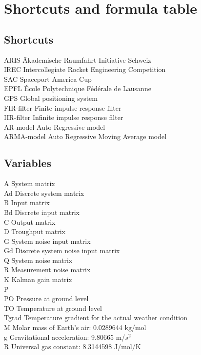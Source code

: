 \chapter{Shortcuts and formula table}
\section{Shortcuts}
\begin{tabbing}
 ARIS    \hspace{5cm} \= Akademische Raumfahrt Initiative Schweiz \\
 IREC 		\> Intercollegiate Rocket Engineering Competition \\
 SAC		\> Spaceport America Cup \\
 EPFL	  	\> École Polytechnique Fédérale de Lausanne \\
 GPS 		\> Global positioning system \\
 FIR-filter 	\> Finite impulse response filter\\
 IIR-filter 	\> Infinite impulse response filter\\
 AR-model 	\> Auto Regressive model\\
 ARMA-model 	\> Auto Regressive Moving Average model \\
 
 
\end{tabbing}

\section{Variables}
\begin{tabbing}
 A \hspace{5cm}	\= System matrix \\
 Ad 		\> Discrete system matrix \\
 B 		\> Input matrix \\
 Bd 		\> Discrete input matrix \\
 C 		\> Output matrix \\
 D 		\> Troughput matrix \\
 G 		\> System noise input matrix \\
 Gd 		\> Discrete system noise input matrix \\
 Q 		\> System noise matrix \\
 R 		\> Measurement noise matrix \\
 K 		\> Kalman gain matrix \\
 P 		\>  \\ %
 PO 		\> Pressure at ground level \\
 TO 		\> Temperature at ground level \\
 Tgrad 		\> Temperature gradient for the actual weather condition \\
 M 		\> Molar mass of Earth's air: 0.0289644 kg/mol\\
 g 		\> Gravitational acceleration: 9.80665 m/$s^2$\\
 R 		\> Universal gas constant: 8.3144598 J/mol/K\\
 
\end{tabbing}

